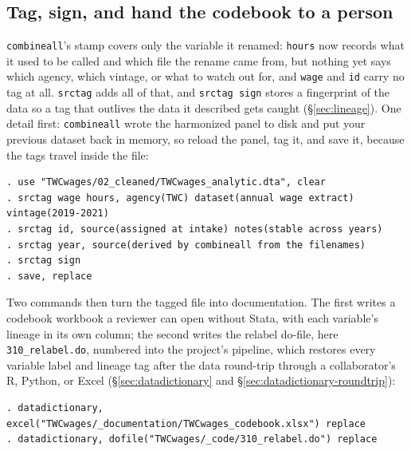 \documentclass[
    a4paper,
    fontsize=10pt,
    twoside=true,
    numbers=noenddot,
]{kaobook}
\begin{document}
\subsection{Tag, sign, and hand the codebook to a person}
\texttt{combineall}'s stamp covers only the variable it renamed: \texttt{hours} now records what it used to be called and which file the rename came from, but nothing yet says which agency, which vintage, or what to watch out for, and \texttt{wage} and \texttt{id} carry no tag at all. \texttt{srctag} adds all of that, and \texttt{srctag sign} stores a fingerprint of the data so a tag that outlives the data it described gets caught (\S\ref{sec:lineage}). One detail first: \texttt{combineall} wrote the harmonized panel to disk and put your previous dataset back in memory, so reload the panel, tag it, and save it, because the tags travel inside the file:
\par
{\footnotesize
\begin{verbatim}
. use "TWCwages/02_cleaned/TWCwages_analytic.dta", clear
. srctag wage hours, agency(TWC) dataset(annual wage extract) vintage(2019-2021)
. srctag id, source(assigned at intake) notes(stable across years)
. srctag year, source(derived by combineall from the filenames)
. srctag sign
. save, replace
\end{verbatim}
}
Two commands then turn the tagged file into documentation. The first writes a codebook workbook a reviewer can open without Stata, with each variable's lineage in its own column; the second writes the relabel do-file, here \texttt{310\_relabel.do}, numbered into the project's pipeline, which restores every variable label and lineage tag after the data round-trip through a collaborator's R, Python, or Excel (\S\ref{sec:datadictionary} and \S\ref{sec:datadictionary-roundtrip}):
\par
{\footnotesize
\begin{verbatim}
. datadictionary, excel("TWCwages/_documentation/TWCwages_codebook.xlsx") replace
. datadictionary, dofile("TWCwages/_code/310_relabel.do") replace
\end{verbatim}
}
\end{document}
